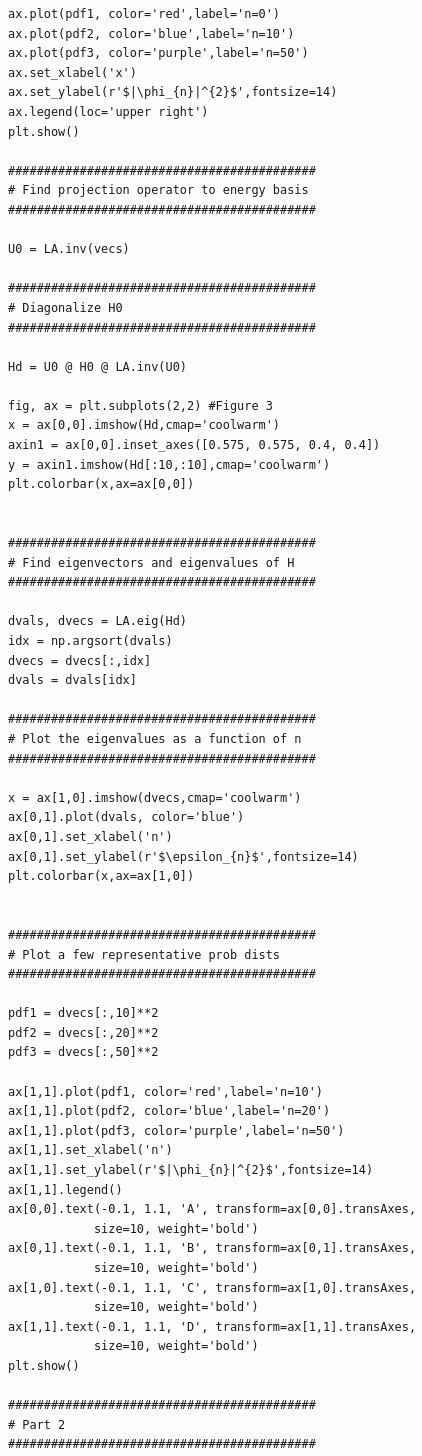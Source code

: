 \documentclass[12pt]{article}
\theoremstyle{definition}
\begin{document}
{\begin{lstlisting}
ax.plot(pdf1, color='red',label='n=0')
ax.plot(pdf2, color='blue',label='n=10')
ax.plot(pdf3, color='purple',label='n=50')
ax.set_xlabel('x')
ax.set_ylabel(r'$|\phi_{n}|^{2}$',fontsize=14)
ax.legend(loc='upper right')
plt.show()

###########################################
# Find projection operator to energy basis
###########################################

U0 = LA.inv(vecs)

###########################################
# Diagonalize H0
###########################################

Hd = U0 @ H0 @ LA.inv(U0)

fig, ax = plt.subplots(2,2) #Figure 3
x = ax[0,0].imshow(Hd,cmap='coolwarm')
axin1 = ax[0,0].inset_axes([0.575, 0.575, 0.4, 0.4])
y = axin1.imshow(Hd[:10,:10],cmap='coolwarm')
plt.colorbar(x,ax=ax[0,0])


###########################################
# Find eigenvectors and eigenvalues of H
###########################################

dvals, dvecs = LA.eig(Hd)
idx = np.argsort(dvals)
dvecs = dvecs[:,idx]
dvals = dvals[idx]

###########################################
# Plot the eigenvalues as a function of n
###########################################

x = ax[1,0].imshow(dvecs,cmap='coolwarm')
ax[0,1].plot(dvals, color='blue')
ax[0,1].set_xlabel('n')
ax[0,1].set_ylabel(r'$\epsilon_{n}$',fontsize=14)
plt.colorbar(x,ax=ax[1,0])


###########################################
# Plot a few representative prob dists
###########################################

pdf1 = dvecs[:,10]**2
pdf2 = dvecs[:,20]**2
pdf3 = dvecs[:,50]**2

ax[1,1].plot(pdf1, color='red',label='n=10')
ax[1,1].plot(pdf2, color='blue',label='n=20')
ax[1,1].plot(pdf3, color='purple',label='n=50')
ax[1,1].set_xlabel('n')
ax[1,1].set_ylabel(r'$|\phi_{n}|^{2}$',fontsize=14)
ax[1,1].legend()
ax[0,0].text(-0.1, 1.1, 'A', transform=ax[0,0].transAxes, 
            size=10, weight='bold')
ax[0,1].text(-0.1, 1.1, 'B', transform=ax[0,1].transAxes, 
            size=10, weight='bold')
ax[1,0].text(-0.1, 1.1, 'C', transform=ax[1,0].transAxes, 
            size=10, weight='bold')
ax[1,1].text(-0.1, 1.1, 'D', transform=ax[1,1].transAxes, 
            size=10, weight='bold')
plt.show()

###########################################
# Part 2
###########################################


\end{lstlisting}}
\end{document}
